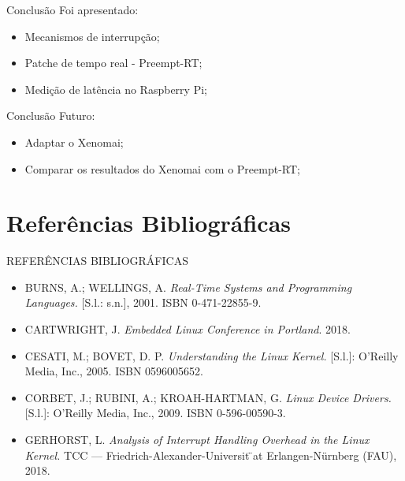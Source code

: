 \documentclass[12pt,brazil]{beamer}
\begin{document}
\begin{frame}{Conclusão}
    Foi apresentado:
    \begin{itemize}
        \item Mecanismos de interrupção;
        \item Patche de tempo real - Preempt-RT;
        \item Medição de latência no Raspberry Pi;
    \end{itemize}
\end{frame}

\begin{frame}{Conclusão}
    Futuro:
    \begin{itemize}
        \item Adaptar o Xenomai;
        \item Comparar os resultados do Xenomai com o Preempt-RT;
    \end{itemize}
\end{frame}

\section{Referências Bibliográficas}

\begin{frame}{REFERÊNCIAS BIBLIOGRÁFICAS}

\begin{itemize}
    \item BURNS, A.; WELLINGS, A. \textit{Real-Time Systems and Programming Languages.} [S.l.: s.n.], 2001. ISBN 0-471-22855-9.
    \item CARTWRIGHT, J. \textit{Embedded Linux Conference in Portland}. 2018.
    \item CESATI, M.; BOVET, D. P. \textit{Understanding the Linux Kernel.} [S.l.]: O’Reilly Media, Inc., 2005. ISBN 0596005652.
    \item CORBET, J.; RUBINI, A.; KROAH-HARTMAN, G. \textit{Linux Device Drivers.} [S.l.]: O’Reilly Media, Inc., 2009. ISBN 0-596-00590-3.
    \item GERHORST, L. \textit{Analysis of Interrupt Handling Overhead in the Linux Kernel.} TCC — Friedrich-Alexander-Universit ̈at Erlangen-Nürnberg (FAU), 2018.
\end{itemize}

\end{frame}
\end{document}
